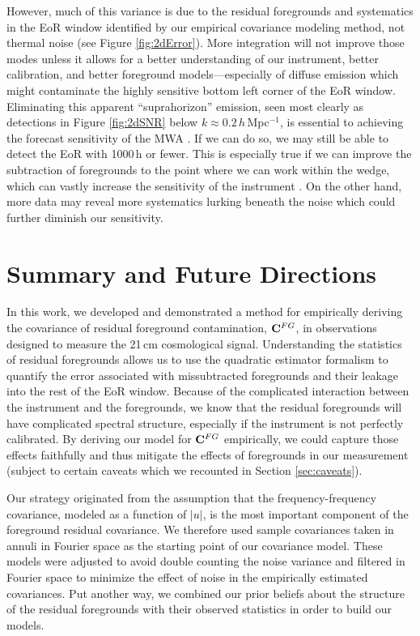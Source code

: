 However, much of this variance is due to the residual foregrounds and systematics in the EoR window identified by our empirical covariance modeling method, not thermal noise (see Figure \ref{fig:2dError}). More integration will not improve those modes unless it allows for a better understanding of our instrument, better calibration, and better foreground models---especially of diffuse emission which might contaminate the highly sensitive bottom left corner of the EoR window. Eliminating this apparent ``suprahorizon'' emission, seen most clearly as detections in Figure \ref{fig:2dSNR} below $k \approx 0.2$\,$h$\,Mpc$^{-1}$, is essential to achieving the forecast sensitivity of the MWA \citep{beardsley13}. If we can do so, we may still be able to detect the EoR with 1000\,h or fewer. This is especially true if we can improve the subtraction of foregrounds to the point where we can work within the wedge, which can vastly increase the sensitivity of the instrument \citep{beardsley13,PoberNextGen}. On the other hand, more data may reveal more systematics lurking beneath the noise which could further diminish our sensitivity.


\section{Summary and Future Directions} \label{sec:summary}

In this work, we developed and demonstrated a method for empirically deriving the covariance of residual foreground contamination, $\mathbf{C}^{FG}$, in observations designed to measure the 21\,cm cosmological signal. Understanding the statistics of residual foregrounds allows us to use the quadratic estimator formalism to quantify the error associated with missubtracted foregrounds and their leakage into the rest of the EoR window. Because of the complicated interaction between the instrument and the foregrounds, we know that the residual foregrounds will have complicated spectral structure, especially if the instrument is not perfectly calibrated. By deriving our model for $\mathbf{C}^{FG}$ empirically, we could capture those effects faithfully and thus mitigate the effects of foregrounds in our measurement (subject to certain caveats which we recounted in Section \ref{sec:caveats}).

Our strategy originated from the assumption that the frequency-frequency covariance, modeled as a function of $|u|$, is the most important component of the foreground residual covariance. We therefore used sample covariances taken in annuli in Fourier space as the starting point of our covariance model. These models were adjusted to avoid double counting the noise variance and filtered in Fourier space to minimize the effect of noise in the empirically estimated covariances. Put another way, we combined our prior beliefs about the structure of the residual foregrounds with their observed statistics in order to build our models.

